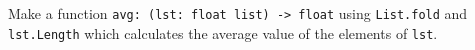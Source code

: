 Make a function \lstinline{avg: (lst: float list) -> float} using \lstinline{List.fold} and \lstinline{lst.Length} which calculates the average value of the elements of \lstinline{lst}.